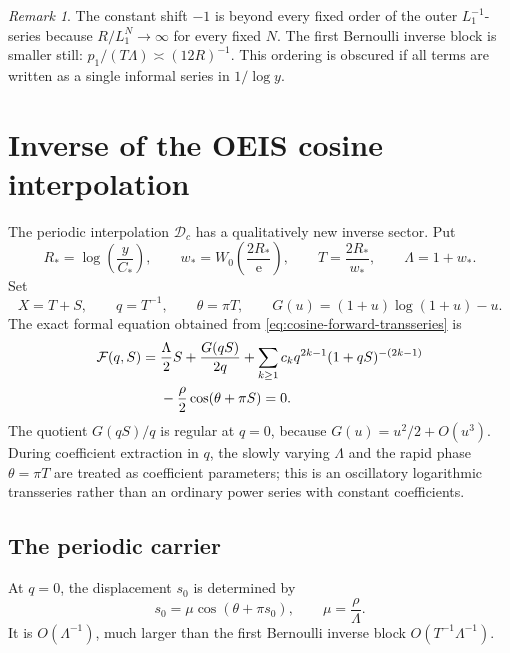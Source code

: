 \documentclass[11pt,oneside]{article}
\theoremstyle{plain}
\theoremstyle{definition}
\theoremstyle{remark}
\newtheorem{remark}[theorem]{Remark}
\newcommand{\e}{\mathrm e}
\newcommand{\Dc}{\mathcal D_{\!c}}
\begin{document}
\begin{remark}
The constant shift \(-1\) is beyond every fixed order of the outer
\(L_1^{-1}\)-series because \(R/L_1^N\to\infty\) for every fixed \(N\).  The
first Bernoulli inverse block is smaller still:
\(
 p_1/(T\Lambda)\asymp(12R)^{-1}
\).
This ordering is obscured if all terms are written as a single informal series
in \(1/\log y\).
\end{remark}

\section{Inverse of the OEIS cosine interpolation}
\label{sec:cosine-inverse}

The periodic interpolation \(\Dc\) has a qualitatively new inverse sector.  Put
\begin{equation}
 R_*=\log\!\left(\frac y{C_*}\right),
 \qquad
 w_*=W_0\!\left(\frac{2R_*}{\e}\right),
 \qquad
 T=\frac{2R_*}{w_*},
 \qquad
 \Lambda=1+w_*.
 \label{eq:cosine-core}
\end{equation}
Set
\begin{equation}
 X=T+S,
 \qquad q=T^{-1},
 \qquad \theta=\pi T,
 \qquad
 G(u)=(1+u)\log(1+u)-u.
 \label{eq:cosine-S}
\end{equation}
The exact formal equation obtained from
\cref{eq:cosine-forward-transseries} is
\begin{align}
 \mathcal F(q,S)={}&
 \frac\Lambda2S+\frac{G(qS)}{2q}
 +\sum_{k\ge1}c_kq^{2k-1}(1+qS)^{-(2k-1)}
 \notag\\
 &-\frac\rho2\cos(\theta+\pi S)=0.
 \label{eq:cosine-F}
\end{align}
The quotient \(G(qS)/q\) is regular at \(q=0\), because \(G(u)=u^2/2+O(u^3)\).
During coefficient extraction in \(q\), the slowly varying \(\Lambda\) and the rapid phase
\(\theta=\pi T\) are treated as coefficient parameters; this is an oscillatory
logarithmic transseries rather than an ordinary power series with constant coefficients.

\subsection{The periodic carrier}

At \(q=0\), the displacement \(s_0\) is determined by
\begin{equation}
 s_0=\mu\cos(\theta+\pi s_0),
 \qquad
 \mu=\frac\rho\Lambda.
 \label{eq:carrier-equation}
\end{equation}
It is \(O(\Lambda^{-1})\), much larger than the first Bernoulli inverse block
\(O(T^{-1}\Lambda^{-1})\).
\end{document}
